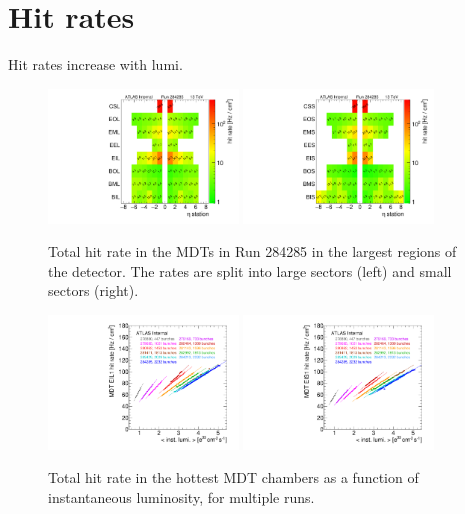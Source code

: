 \section{Hit rates}
\label{sec:hitrates}

Hit rates increase with lumi.

\begin{figure}
  \begin{center}
    \includegraphics[width=0.45\textwidth]{./figures/rate_raw_vs_region_L_00284285.pdf}
    \includegraphics[width=0.45\textwidth]{./figures/rate_raw_vs_region_S_00284285.pdf}
    \caption{Total hit rate in the MDTs in Run 284285 in the largest regions of the detector. The rates are split into large sectors (left) and small sectors (right).}
    \label{fig:hitrates-vs-region-raw}
  \end{center}
\end{figure}

\begin{figure}
  \begin{center}
    \includegraphics[width=0.45\textwidth]{./figures/rate_raw_vs_lumi_vs_evts_mdt_EIL1_overlay.pdf}
    \includegraphics[width=0.45\textwidth]{./figures/rate_raw_vs_lumi_vs_evts_mdt_EIS1_overlay.pdf}
    \caption{Total hit rate in the hottest MDT chambers as a function of instantaneous luminosity, for multiple runs.}
    \label{fig:hitrates-vs-lumi-mdt-raw}
  \end{center}
\end{figure}

